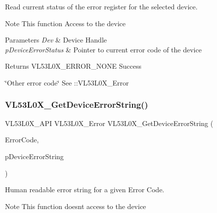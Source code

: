 Read current status of the error register for the selected device. 

\begin{DoxyNote}{Note}
This function Access to the device
\end{DoxyNote}

\begin{DoxyParams}{Parameters}
{\em Dev} & Device Handle \\
\hline
{\em p\+Device\+Error\+Status} & Pointer to current error code of the device \\
\hline
\end{DoxyParams}
\begin{DoxyReturn}{Returns}
V\+L53\+L0\+X\+\_\+\+E\+R\+R\+O\+R\+\_\+\+N\+O\+NE Success 

\char`\"{}\+Other error code\char`\"{} See \+::\+V\+L53\+L0\+X\+\_\+\+Error 
\end{DoxyReturn}
\mbox{\label{group__VL53L0X__general__group_ga3532722a77431334a391fb8247cd334f}} 
\subsubsection{\texorpdfstring{V\+L53\+L0\+X\+\_\+\+Get\+Device\+Error\+String()}{VL53L0X\_GetDeviceErrorString()}}
{\footnotesize\ttfamily V\+L53\+L0\+X\+\_\+\+A\+PI V\+L53\+L0\+X\+\_\+\+Error V\+L53\+L0\+X\+\_\+\+Get\+Device\+Error\+String (\begin{DoxyParamCaption}\item[{V\+L53\+L0\+X\+\_\+\+Device\+Error}]{Error\+Code,  }\item[{char $\ast$}]{p\+Device\+Error\+String }\end{DoxyParamCaption})}



Human readable error string for a given Error Code. 

\begin{DoxyNote}{Note}
This function doesn\textquotesingle{}t access to the device
\end{DoxyNote}

